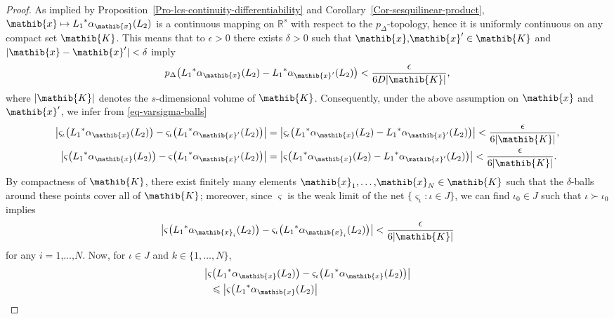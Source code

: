 \documentclass[11pt,twoside,openright]{report}
\theoremstyle{definition}
\theoremstyle{plain}
\theoremstyle{remark}
\theoremstyle{assumption}
\newcommand{\set}[1]{\{ #1 \}}
\newcommand{\bset}[1]{\bigl\{ #1 \bigr\}}
\newcommand{\abs}[1]{\lvert #1 \rvert}
\newcommand{\babs}[1]{\bigl\lvert #1 \bigr\rvert}
\newcommand{\pD}{p_\Delta}
\newcommand{\bpDx}[1]{p_\Delta \bigl( #1 \bigr)}
\newcommand{\Kib}{\mathib{K}}
\newcommand{\xib}{\mathib{x}}
\newcommand{\Rs}{\mathbb{R}^s}
\newcommand{\aibx}{\alpha_\mathib{x}}
\newcommand{\aibxprime}{\alpha_{\mathib{x}'}}
\begin{document}
\begin{proof}
  As implied by Proposition~\ref{Pro-lcs-continuity-differentiability}
  and Corollary~\ref{Cor-sesquilinear-product}, $\xib \mapsto {L_1}^*
  \aibx ( L_2 )$ is a continuous mapping on $\Rs$ with respect to the
  $\pD$-topology, hence it is uniformly continuous on any compact set
  $\Kib$. This means that to $\epsilon > 0$ there exists $\delta > 0$
  such that $\xib \text{,} \xib' \in \Kib$ and $\abs{\xib - \xib'} <
  \delta$ imply
  \begin{equation*}
    \bpDx{{L_1}^* \aibx ( L_2 ) - {L_1}^* \aibxprime ( L_2 )} <
    \frac{\epsilon}{6 D \abs{\Kib}} \text{,}
  \end{equation*}
  where $\abs{\Kib}$ denotes the $s$-dimensional volume of $\Kib$.
  Consequently, under the above assumption on $\xib$ and $\xib'$, we
  infer from \eqref{eq-varsigma-balls}
  \begin{align*}
    \babs{\varsigma_\iota \bigl( {L_1}^* \aibx ( L_2 ) \bigr) -
    \varsigma_\iota \bigl( {L_1}^* \aibxprime ( L_2 ) \bigr)} & =
    \babs{\varsigma_\iota \bigl( {L_1}^* \aibx ( L_2 ) - {L_1}^*
    \aibxprime ( L_2 ) \bigr)} < \frac{\epsilon}{6 \abs{\Kib}}
    \text{,} \\ 
    \babs{\varsigma \bigl( {L_1}^* \aibx ( L_2 ) \bigr) - \varsigma
    \bigl( {L_1}^* \aibxprime ( L_2 ) \bigr)} & = \babs{\varsigma
    \bigl( {L_1}^* \aibx ( L_2 ) - {L_1}^* \aibxprime ( L_2 ) \bigr)}
    < \frac{\epsilon}{6 \abs{\Kib}} \text{.}
  \end{align*}
  By compactness of $\Kib$, there exist finitely many elements $\xib_1
  \text{,} \dots \text{,} \xib_N \in \Kib$ such that the
  $\delta$-balls around these points cover all of $\Kib$; moreover,
  since $\varsigma$ is the weak limit of the net
  $\bset{\varsigma_\iota : \iota \in J}$, we can find $\iota_0 \in J$
  such that $\iota \succ \iota_0$ implies
  \begin{equation*}
    \babs{\varsigma \bigl( {L_1}^* \alpha_{\xib_i} ( L_2 ) \bigr) -
    \varsigma_\iota \bigl( {L_1}^* \alpha_{\xib_i} ( L_2 ) \bigr)} <
    \frac{\epsilon}{6 \abs{\Kib}}
  \end{equation*}
  for any $i=1 \text{,} \dots \text{,} N$. Now, for $\iota \in J$ and
  $k \in \set{1 , \dots , N}$,
  \begin{multline*}
    \babs{\varsigma \bigl( {L_1}^* \aibx ( L_2 ) \bigr) -
    \varsigma_\iota \bigl( {L_1}^* \aibx ( L_2 ) \bigr)} \\
    \shoveleft{\leqslant \babs{\varsigma \bigl( {L_1}^* \aibx ( L_2 )
}}
\end{multline*}
\end{proof}
\end{document}
